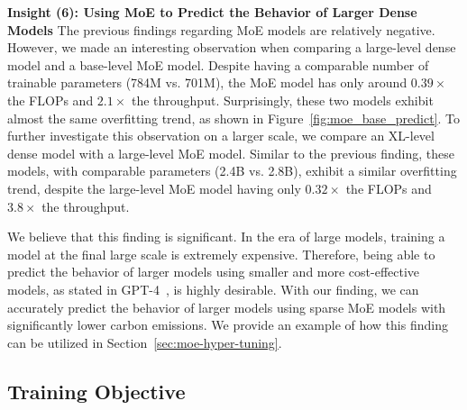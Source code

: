 \documentclass{article}
\begin{document}
\textbf{Insight (6): Using MoE to Predict the Behavior of Larger Dense Models}
The previous findings regarding MoE models are relatively negative. However, we made an interesting observation when comparing a large-level dense model and a base-level MoE model. Despite having a comparable number of trainable parameters (784M vs. 701M), the MoE model has only around $0.39\times$ the FLOPs and $2.1\times$ the throughput. Surprisingly, these two models exhibit almost the same overfitting trend, as shown in Figure~\ref{fig:moe_base_predict}. To further investigate this observation on a larger scale, we compare an XL-level dense model with a large-level MoE model. Similar to the previous finding, these models, with comparable parameters (2.4B vs. 2.8B), exhibit a similar overfitting trend, despite the large-level MoE model having only $0.32\times$ the FLOPs and $3.8\times$ the throughput.

We believe that this finding is significant. In the era of large models, training a model at the final large scale is extremely expensive. Therefore, being able to predict the behavior of larger models using smaller and more cost-effective models, as stated in GPT-4~\citep{OpenAI2023GPT4TR}, is highly desirable. With our finding, we can accurately predict the behavior of larger models using sparse MoE models with significantly lower carbon emissions. We provide an example of how this finding can be utilized in Section~\ref{sec:moe-hyper-tuning}.


\subsection{Training Objective}

\end{document}
